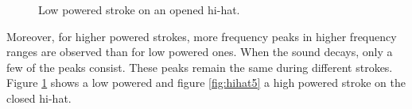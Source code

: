 \begin{figure}
	\centering
	\qquad
	\caption{Low powered stroke on an opened hi-hat.}
	\label{fig:hihat4}
\end{figure}

Moreover, for higher powered strokes, more frequency peaks in higher frequency ranges are observed than for low powered ones. When the sound decays, only a few of the peaks consist. These peaks remain the same during different strokes. Figure \ref{fig:hihat4} shows a low powered and figure \ref{fig:hihat5} a high powered stroke on the closed hi-hat.
	
